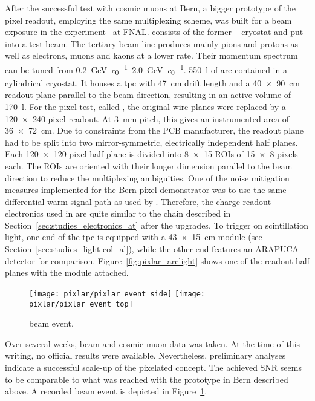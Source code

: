 After the successful test with cosmic muons at Bern, a bigger prototype of the pixel readout, employing the same multiplexing scheme, was built for a beam exposure in the \lariat{} experiment~\cite{lariat} at FNAL.
\lariat{} consists of the former \argoneut{}~\cite{argoneut} cryostat and \lartpc{} put into a test beam.
The tertiary beam line produces mainly pions and protons as well as electrons, muons and kaons at a lower rate.
Their momentum spectrum can be tuned from \SIrange{0.2}{2.0}{\giga\electronvolt\per\clight}.
\SI{550}{\litre} of \lar{} are contained in a cylindrical cryostat.
It houses a \gls{tpc} with \SI{47}{\centi\metre} drift length and a \SI{40 x 90}{\centi\metre} readout plane parallel to the beam direction, resulting in an active volume of \SI{170}{\litre}.
For the pixel test, called \pixlar{}, the original wire planes were replaced by a \num{120 x 240} pixel readout.
At \SI{3}{\milli\metre} pitch, this gives an instrumented area of \SI{36 x 72}{\centi\metre}.
Due to constraints from the PCB manufacturer, the readout plane had to be split into two mirror-symmetric, electrically independent half planes.
Each \num{120 x 120} pixel half plane is divided into \num{8 x 15} ROIs of \num{15 x 8} pixels each.
The ROIs are oriented with their longer dimension parallel to the beam direction to reduce the multiplexing ambiguities.
One of the noise mitigation measures implemented for the Bern pixel demonstrator was to use the same differential warm signal path as used by \lariat{}.
Therefore, the charge readout electronics used in \pixlar{} are quite similar to the \AT{} chain described in Section~\ref{sec:studies_electronics_at} after the upgrades.
To trigger on scintillation light, one end of the \gls{tpc} is equipped with a \SI{43 x 15}{\centi\metre} \AL{} module (see Section~\ref{sec:studies_light-col_al}), while the other end features an ARAPUCA~\cite{arapuca} detector for comparison.
Figure~\ref{fig:pixlar_arclight} shows one of the readout half planes with the \AL{} module attached.

\begin{figure}[htb]
	\centering
	\texttt{[image: pixlar/pixlar\_event\_side]}
	\texttt{[image: pixlar/pixlar\_event\_top]}
	\caption{\pixlar{} beam event.}
	\label{fig:pixlar_event}
\end{figure}

Over several weeks, beam and cosmic muon data was taken.
At the time of this writing, no official results were available.
Nevertheless, preliminary analyses indicate a successful scale-up of the pixelated \lartpc{} concept.
The achieved SNR seems to be comparable to what was reached with the prototype in Bern described above.
A recorded beam event is depicted in Figure~\ref{fig:pixlar_event}.